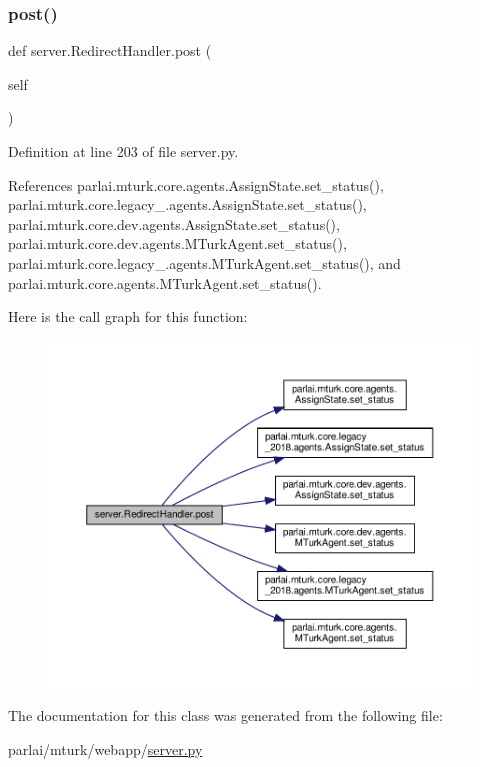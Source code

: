 \subsubsection{\texorpdfstring{post()}{post()}}
{\footnotesize\ttfamily def server.\+Redirect\+Handler.\+post (\begin{DoxyParamCaption}\item[{}]{self }\end{DoxyParamCaption})}



Definition at line 203 of file server.\+py.



References parlai.\+mturk.\+core.\+agents.\+Assign\+State.\+set\+\_\+status(), parlai.\+mturk.\+core.\+legacy\+\_.\+agents.\+Assign\+State.\+set\+\_\+status(), parlai.\+mturk.\+core.\+dev.\+agents.\+Assign\+State.\+set\+\_\+status(), parlai.\+mturk.\+core.\+dev.\+agents.\+M\+Turk\+Agent.\+set\+\_\+status(), parlai.\+mturk.\+core.\+legacy\+\_.\+agents.\+M\+Turk\+Agent.\+set\+\_\+status(), and parlai.\+mturk.\+core.\+agents.\+M\+Turk\+Agent.\+set\+\_\+status().

Here is the call graph for this function\+:
\nopagebreak
\begin{figure}[H]
\begin{center}
\leavevmode
\includegraphics[width=350pt]{classserver_1_1RedirectHandler_aa6080e460e55dacb9d05e4b1575d4c8a_cgraph}
\end{center}
\end{figure}


The documentation for this class was generated from the following file\+:\begin{DoxyCompactItemize}
\item 
parlai/mturk/webapp/\hyperlink{server_8py}{server.\+py}\end{DoxyCompactItemize}
